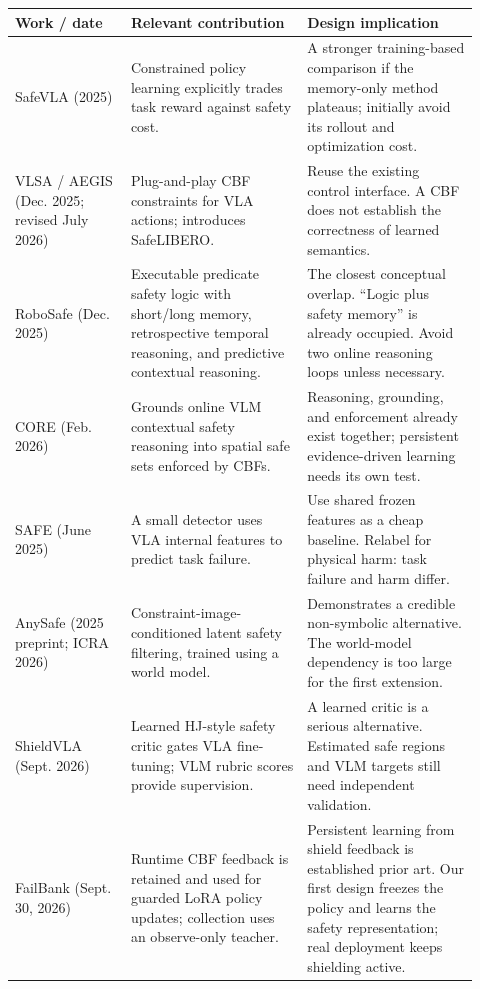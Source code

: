 \documentclass[10pt]{article}
\begin{document}
\small
\begin{longtable}{p{0.23\linewidth}p{0.35\linewidth}p{0.34\linewidth}}
\toprule
Work / date & Relevant contribution & Design implication\\\midrule\endhead
SafeVLA (2025) \cite{safevla} & Constrained policy learning explicitly trades task reward against safety cost. & A stronger training-based comparison if the memory-only method plateaus; initially avoid its rollout and optimization cost.\\
VLSA / AEGIS (Dec. 2025; revised July 2026) \cite{aegis} & Plug-and-play CBF constraints for VLA actions; introduces SafeLIBERO. & Reuse the existing control interface. A CBF does not establish the correctness of learned semantics.\\
RoboSafe (Dec. 2025) \cite{robosafe} & Executable predicate safety logic with short/long memory, retrospective temporal reasoning, and predictive contextual reasoning. & The closest conceptual overlap. ``Logic plus safety memory'' is already occupied. Avoid two online reasoning loops unless necessary.\\
CORE (Feb. 2026) \cite{core} & Grounds online VLM contextual safety reasoning into spatial safe sets enforced by CBFs. & Reasoning, grounding, and enforcement already exist together; persistent evidence-driven learning needs its own test.\\
SAFE (June 2025) \cite{safe} & A small detector uses VLA internal features to predict task failure. & Use shared frozen features as a cheap baseline. Relabel for physical harm: task failure and harm differ.\\
AnySafe (2025 preprint; ICRA 2026) \cite{anysafe} & Constraint-image-conditioned latent safety filtering, trained using a world model. & Demonstrates a credible non-symbolic alternative. The world-model dependency is too large for the first extension.\\
ShieldVLA (Sept. 2026) \cite{shieldvla} & Learned HJ-style safety critic gates VLA fine-tuning; VLM rubric scores provide supervision. & A learned critic is a serious alternative. Estimated safe regions and VLM targets still need independent validation.\\
FailBank (Sept. 30, 2026) \cite{failbank} & Runtime CBF feedback is retained and used for guarded LoRA policy updates; collection uses an observe-only teacher. & Persistent learning from shield feedback is established prior art. Our first design freezes the policy and learns the safety representation; real deployment keeps shielding active.\\

\end{longtable}
\end{document}
